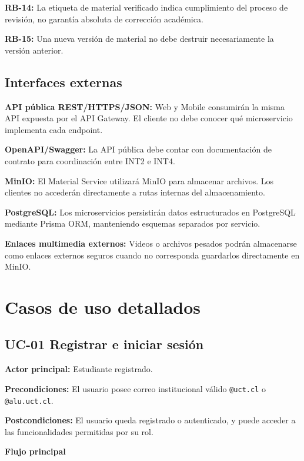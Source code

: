 \documentclass[12pt,a4paper]{article}
\begin{document}
\noindent\textbf{RB-14:} La etiqueta de material verificado indica cumplimiento del proceso de revisión, no garantía absoluta de corrección académica.

\noindent\textbf{RB-15:} Una nueva versión de material no debe destruir necesariamente la versión anterior.

\subsection{Interfaces externas}

\noindent\textbf{API pública REST/HTTPS/JSON:} Web y Mobile consumirán la misma API expuesta por el API Gateway. El cliente no debe conocer qué microservicio implementa cada endpoint.

\noindent\textbf{OpenAPI/Swagger:} La API pública debe contar con documentación de contrato para coordinación entre INT2 e INT4.

\noindent\textbf{MinIO:} El Material Service utilizará MinIO para almacenar archivos. Los clientes no accederán directamente a rutas internas del almacenamiento.

\noindent\textbf{PostgreSQL:} Los microservicios persistirán datos estructurados en PostgreSQL mediante Prisma ORM, manteniendo esquemas separados por servicio.

\noindent\textbf{Enlaces multimedia externos:} Videos o archivos pesados podrán almacenarse como enlaces externos seguros cuando no corresponda guardarlos directamente en MinIO.

\section{Casos de uso detallados}

\subsection{UC-01 Registrar e iniciar sesión}

\noindent\textbf{Actor principal:} Estudiante registrado.

\noindent\textbf{Precondiciones:} El usuario posee correo institucional válido \texttt{@uct.cl} o \texttt{@alu.uct.cl}.

\noindent\textbf{Postcondiciones:} El usuario queda registrado o autenticado, y puede acceder a las funcionalidades permitidas por su rol.

\noindent\textbf{Flujo principal}
\end{document}
